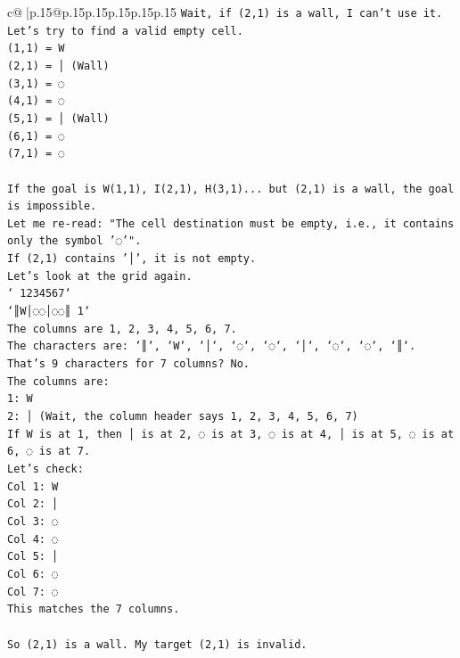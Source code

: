\documentclass{article}
\begin{document}
{\begin{supertabular}{c@{$\;$}|p{.15\linewidth}@{}p{.15\linewidth}p{.15\linewidth}p{.15\linewidth}p{.15\linewidth}p{.15\linewidth}}
{{{\texttt{Wait, if (2,1) is a wall, I can't use it.} \\
\texttt{Let's try to find a valid empty cell.} \\
\texttt{(1,1) = W} \\
\texttt{(2,1) = │ (Wall)} \\
\texttt{(3,1) = ◌} \\
\texttt{(4,1) = ◌} \\
\texttt{(5,1) = │ (Wall)} \\
\texttt{(6,1) = ◌} \\
\texttt{(7,1) = ◌} \\
\\ 
\texttt{If the goal is W(1,1), I(2,1), H(3,1)... but (2,1) is a wall, the goal is impossible.} \\
\texttt{Let me re{-}read: "The cell destination must be empty, i.e., it contains only the symbol '◌'".} \\
\texttt{If (2,1) contains '│', it is not empty.} \\
\texttt{Let's look at the grid again.} \\
\texttt{` 1234567`} \\
\texttt{`║W│◌◌│◌◌║ 1`} \\
\texttt{The columns are 1, 2, 3, 4, 5, 6, 7.} \\
\texttt{The characters are: `║`, `W`, `│`, `◌`, `◌`, `│`, `◌`, `◌`, `║`.} \\
\texttt{That's 9 characters for 7 columns? No.} \\
\texttt{The columns are:} \\
\texttt{1: W} \\
\texttt{2: │ (Wait, the column header says 1, 2, 3, 4, 5, 6, 7)} \\
\texttt{If W is at 1, then │ is at 2, ◌ is at 3, ◌ is at 4, │ is at 5, ◌ is at 6, ◌ is at 7.} \\
\texttt{Let's check:} \\
\texttt{Col 1: W} \\
\texttt{Col 2: │} \\
\texttt{Col 3: ◌} \\
\texttt{Col 4: ◌} \\
\texttt{Col 5: │} \\
\texttt{Col 6: ◌} \\
\texttt{Col 7: ◌} \\
\texttt{This matches the 7 columns.} \\
\\ 
\texttt{So (2,1) is a wall. My target (2,1) is invalid.} \\
}}}
\end{supertabular}}
\end{document}
